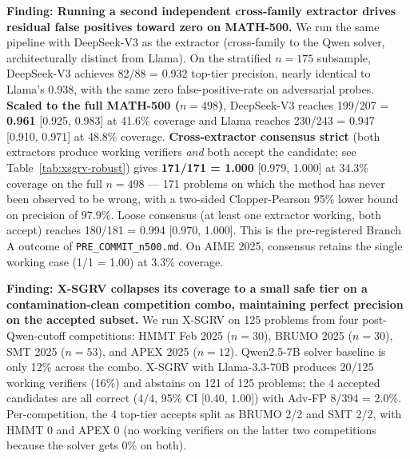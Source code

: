 \documentclass{article}
\begin{document}
\textbf{Finding: Running a second independent cross-family extractor drives residual false positives toward zero on MATH-500.} We run the same pipeline with DeepSeek-V3 as the extractor (cross-family to the Qwen solver, architecturally distinct from Llama). On the stratified $n{=}175$ subsample, DeepSeek-V3 achieves 82/88 = 0.932 top-tier precision, nearly identical to Llama's 0.938, with the same zero false-positive-rate on adversarial probes. \textbf{Scaled to the full MATH-500 ($n{=}498$)}, DeepSeek-V3 reaches 199/207 = \textbf{0.961} [0.925, 0.983] at 41.6\% coverage and Llama reaches 230/243 = 0.947 [0.910, 0.971] at 48.8\% coverage. \textbf{Cross-extractor consensus strict} (both extractors produce working verifiers \emph{and} both accept the candidate; see Table~\ref{tab:xsgrv-robust}) gives \textbf{171/171 = 1.000} [0.979, 1.000] at 34.3\% coverage on the full $n{=}498$ --- 171 problems on which the method has never been observed to be wrong, with a two-sided Clopper-Pearson 95\% lower bound on precision of $97.9\%$. Loose consensus (at least one extractor working, both accept) reaches 180/181 = 0.994 [0.970, 1.000]. This is the pre-registered Branch A outcome of \texttt{PRE\_COMMIT\_n500.md}. On AIME 2025, consensus retains the single working case (1/1 = 1.00) at 3.3\% coverage.

\textbf{Finding: X-SGRV collapses its coverage to a small safe tier on a contamination-clean competition combo, maintaining perfect precision on the accepted subset.} We run X-SGRV on 125 problems from four post-Qwen-cutoff competitions: HMMT Feb 2025 ($n{=}30$), BRUMO 2025 ($n{=}30$), SMT 2025 ($n{=}53$), and APEX 2025 ($n{=}12$). Qwen2.5-7B solver baseline is only 12\% across the combo. X-SGRV with Llama-3.3-70B produces 20/125 working verifiers (16\%) and abstains on 121 of 125 problems; the 4 accepted candidates are all correct ($4/4$, 95\% CI [0.40, 1.00]) with Adv-FP 8/394 = 2.0\%. Per-competition, the 4 top-tier accepts split as BRUMO 2/2 and SMT 2/2, with HMMT 0 and APEX 0 (no working verifiers on the latter two competitions because the solver gets 0\% on both).
\end{document}
